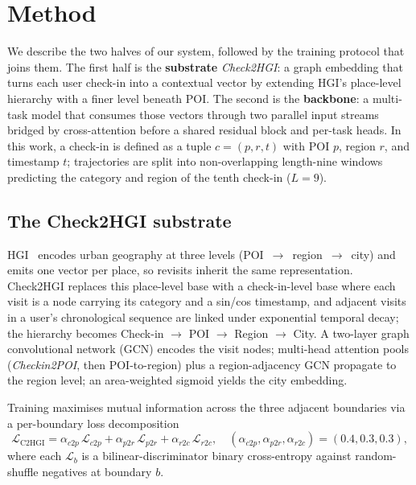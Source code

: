 \section{Method}
\label{sec:method}

We describe the two halves of our system, followed by the training protocol that joins them. The first half is the \textbf{substrate} \emph{Check2HGI}: a graph embedding that turns each user check-in into a contextual vector by extending HGI's place-level hierarchy with a finer level beneath POI. The second is the \textbf{backbone}: a multi-task model that consumes those vectors through two parallel input streams bridged by cross-attention before a shared residual block and per-task heads. In this work, a check-in is defined as a tuple $c=(p,r,t)$ with POI $p$, region $r$, and timestamp $t$; trajectories are split into non-overlapping length-nine windows predicting the category and region of the tenth check-in ($L=9$).

\subsection{The Check2HGI substrate}
\label{subsec:method-substrate}

HGI~\cite{huang2023hgi} encodes urban geography at three levels (POI~$\to$~region~$\to$~city) and emits one vector per place, so revisits inherit the same representation. Check2HGI replaces this place-level base with a check-in-level base where each visit is a node carrying its category and a sin/cos timestamp, and adjacent visits in a user's chronological sequence are linked under exponential temporal decay; the hierarchy becomes Check-in $\to$ POI $\to$ Region $\to$ City. A two-layer graph convolutional network (GCN) encodes the visit nodes; multi-head attention pools (\emph{Checkin2POI}, then POI-to-region) plus a region-adjacency GCN propagate to the region level; an area-weighted sigmoid yields the city embedding.

Training maximises mutual information across the three adjacent boundaries via a per-boundary loss decomposition
\begin{equation}
  \mathcal{L}_{\text{C2HGI}} = \alpha_{c2p}\,\mathcal{L}_{c2p} + \alpha_{p2r}\,\mathcal{L}_{p2r} + \alpha_{r2c}\,\mathcal{L}_{r2c},
  \quad (\alpha_{c2p}, \alpha_{p2r}, \alpha_{r2c}) = (0.4, 0.3, 0.3),
  \label{eq:c2hgi}
\end{equation}
where each $\mathcal{L}_b$ is a bilinear-discriminator binary cross-entropy against random-shuffle negatives at boundary $b$.

